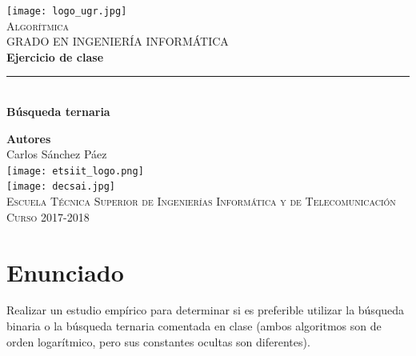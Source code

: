 \documentclass[12pt,spanish]{article}
\begin{document}
\begin{titlepage}

\newlength{\centeroffset}
\setlength{\centeroffset}{-0.5\oddsidemargin}
\addtolength{\centeroffset}{0.5\evensidemargin}
\thispagestyle{empty}

\noindent\hspace*{\centeroffset}
\begin{minipage}{\textwidth}

\centering
\texttt{[image: logo\_ugr.jpg]}\\[1.4cm]

\textsc{ \Large Algorítmica\\[0.2cm]}
\textsc{GRADO EN INGENIERÍA INFORMÁTICA}\\[1cm]

{\Huge\bfseries Ejercicio de clase\\}
\noindent\rule[-1ex]{\textwidth}{3pt}\\[3.5ex]
{\large\bfseries Búsqueda ternaria}
\end{minipage}

\vspace{1.5cm}
\noindent\hspace*{\centeroffset}
\begin{minipage}{\textwidth}
\centering

\textbf{Autores}\\ {Carlos Sánchez Páez}\\[2.5ex]
\texttt{[image: etsiit\_logo.png]}\\[0.1cm]
\vspace{1.5cm}
\texttt{[image: decsai.jpg]}\\[0.1cm]
\vspace{1cm}
\textsc{Escuela Técnica Superior de Ingenierías Informática y de Telecomunicación}\\
\vspace{1cm}
\textsc{Curso 2017-2018}
\end{minipage}
\end{titlepage}
\tableofcontents
\thispagestyle{empty}
\listoftables
\listoffigures
\newpage
\setcounter{page}{1}

\section{Enunciado}
\large{Realizar un estudio empírico para determinar si es preferible utilizar la búsqueda binaria o la búsqueda ternaria comentada en clase (ambos algoritmos son de orden logarítmico, pero sus constantes ocultas son diferentes).}
\end{document}
